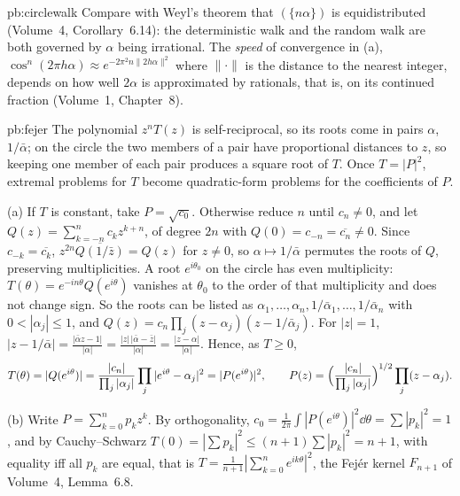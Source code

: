 \begin{solution}{pb:circlewalk}
\leads Compare with Weyl's theorem that $(\{n\alpha\})$ is equidistributed (Volume~4, Corollary~6.14): the deterministic walk and the random walk
are both governed by $\alpha$ being irrational. The \emph{speed} of convergence in (a), $\cos^n(2\pi h\alpha)\approx e^{-2\pi^2n\|2h\alpha\|^2}$ where $\|\cdot\|$ is the
distance to the nearest integer, depends on how well $2\alpha$ is approximated by rationals, that is, on its continued fraction (Volume~1,
Chapter~8).
\end{solution}

\begin{solution}{pb:fejer}
\idea The polynomial $z^nT(z)$ is self-reciprocal, so its roots come in pairs $\alpha$, $1/\bar\alpha$; on the circle the two members of a pair
have proportional distances to $z$, so keeping one member of each pair produces a square root of $T$. Once $T=|P|^2$, extremal problems
for $T$ become quadratic-form problems for the coefficients of $P$.

\writeup (a) If $T$ is constant, take $P=\sqrt{c_0}$. Otherwise reduce $n$ until $c_n\ne0$, and let $Q(z)=\sum_{k=-n}^nc_kz^{k+n}$, of degree $2n$ with $Q(0)=c_{-n}=\overline{c_n}\ne0$.
Since $c_{-k}=\overline{c_k}$, $z^{2n}\overline{Q(1/\bar z)}=Q(z)$ for $z\ne0$, so $\alpha\mapsto1/\bar\alpha$ permutes the roots of $Q$, preserving multiplicities. A root
$e^{i\theta_0}$ on the circle has even multiplicity: $T(\theta)=e^{-in\theta}Q(e^{i\theta})$ vanishes at $\theta_0$ to the order of that multiplicity and does not change
sign. So the roots can be listed as $\alpha_1,\dots,\alpha_n,1/\bar\alpha_1,\dots,1/\bar\alpha_n$ with $0<|\alpha_j|\le1$, and $Q(z)=c_n\prod_j(z-\alpha_j)(z-1/\bar\alpha_j)$. For $|z|=1$,
$|z-1/\bar\alpha|=\frac{|\bar\alpha z-1|}{|\alpha|}=\frac{|z|\,|\bar\alpha-\bar z|}{|\alpha|}=\frac{|z-\alpha|}{|\alpha|}$. Hence, as $T\ge0$,
\[
T(\theta)=|Q(e^{i\theta})|=\frac{|c_n|}{\prod_j|\alpha_j|}\prod_j|e^{i\theta}-\alpha_j|^2=|P(e^{i\theta})|^2,\qquad P(z)=\Bigl(\frac{|c_n|}{\prod_j|\alpha_j|}\Bigr)^{1/2}\prod_j(z-\alpha_j).
\]

(b) Write $P=\sum_{k=0}^np_kz^k$. By orthogonality, $c_0=\frac1{2\pi}\int|P(e^{i\theta})|^2\dd\theta=\sum|p_k|^2=1$, and by Cauchy--Schwarz
$T(0)=|\sum p_k|^2\le(n+1)\sum|p_k|^2=n+1$, with equality iff all $p_k$ are equal, that is $T=\frac1{n+1}|\sum_{k=0}^ne^{ik\theta}|^2$, the Fejér kernel $F_{n+1}$ of
Volume~4, Lemma~6.8.


\end{solution}
